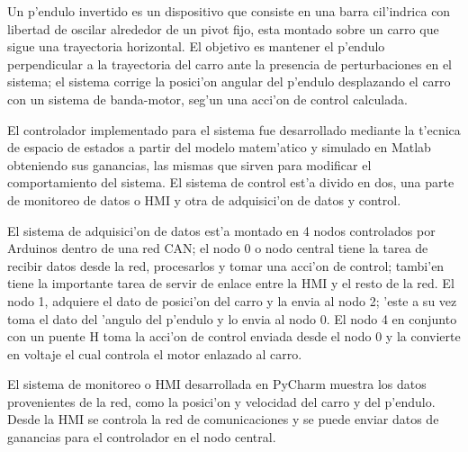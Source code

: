 

Un p'endulo invertido es un dispositivo que consiste en una barra cil'indrica con 
libertad de oscilar alrededor de un pivot fijo, esta montado sobre un carro que sigue  una  trayectoria  horizontal. El objetivo es mantener el p'endulo perpendicular a la trayectoria del carro ante la presencia de perturbaciones en el sistema; el sistema corrige la posici'on angular del p'endulo desplazando el carro con un sistema de banda-motor, seg'un una acci'on de control calculada.

El controlador implementado para el sistema fue desarrollado mediante la t'ecnica de espacio de estados a partir del modelo matem'atico y simulado en Matlab obteniendo sus ganancias, las mismas que sirven para modificar el comportamiento del sistema. El sistema de control est'a divido en dos, una parte de monitoreo de datos o HMI y otra de adquisici'on de datos y control. 

El sistema de adquisici'on de datos est'a montado en 4 nodos controlados por Arduinos dentro de una red CAN; el nodo 0 o nodo central tiene la tarea de recibir datos desde la red, procesarlos y tomar una acci'on de control; tambi'en tiene la importante tarea de servir de enlace entre la HMI y el resto de la red. El nodo 1, adquiere el dato de posici'on del carro y la envia al nodo 2; 'este a su vez toma el dato del 'angulo del p'endulo y lo envia al nodo 0. El nodo 4 en conjunto con un puente H toma la acci'on de control enviada desde el nodo 0 y la convierte en voltaje el cual controla el motor enlazado al carro.

El sistema de monitoreo o HMI desarrollada en PyCharm muestra los datos provenientes de la red, como la posici'on y velocidad del carro y del p'endulo. Desde la HMI se controla la red de comunicaciones y se puede enviar datos de ganancias para el controlador en el nodo central.

